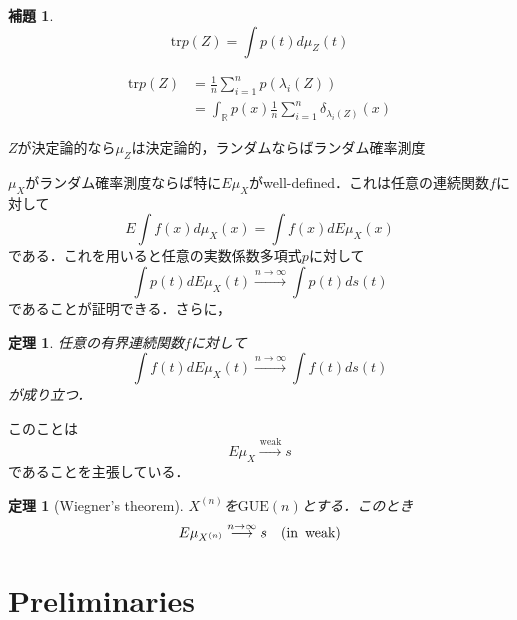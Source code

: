 \documentclass{ltjsarticle}
\makeatletter
\theoremstyle{mystyle1}
\newtheorem{thm}[dfn]{定理}
\newtheorem{lem}[dfn]{補題}
\theoremstyle{mystyle2}
\theoremstyle{mystyle3}
\renewenvironment{proof}[1][\proofname]{\par
  \pushQED{\qed}%
  \normalfont
  \topsep6\p@\@plus6\p@ \trivlist
  \item[\hskip\labelsep{\bfseries\sffamily #1}]\ignorespaces
}{%
  \popQED\endtrivlist\@endpefalse
}
\renewcommand\proofname{証明}
\makeatother
\begin{document}
\begin{lem}
    \begin{equation}
        \mathrm{tr}p(Z)=\int p(t)d\mu_Z(t)
    \end{equation}
\end{lem}

\begin{proof}
    \begin{equation}
        \begin{split}
            \mathrm{tr}p(Z)&=\frac{1}{n}\sum_{i=1}^np(\lambda_i(Z))\\
            &=\int_\mathbb{R}p(x)\frac{1}{n}\sum_{i=1}^n\delta_{\lambda_i(Z)}(x)
        \end{split}
    \end{equation}
\end{proof}

$Z$が決定論的なら$\mu_Z$は決定論的，ランダムならばランダム確率測度

$\mu_X$がランダム確率測度ならば特に$E\mu_{X}$がwell-defined．これは任意の連続関数$f$に対して
\begin{equation}
    E\int f(x)d\mu_{X}(x)=\int f(x)dE\mu_{X}(x)
\end{equation}
である．これを用いると任意の実数係数多項式$p$に対して
\begin{equation}
    \int p(t)dE\mu_{X}(t)\overset{n\to\infty}{\longrightarrow}\int p(t)ds(t)
\end{equation}
であることが証明できる．さらに，
\begin{thm}
    任意の有界連続関数$f$に対して
    \begin{equation}
        \int f(t)dE\mu_{X}(t)\overset{n\to\infty}{\longrightarrow}\int f(t)ds(t)
    \end{equation}
    が成り立つ．
\end{thm}
このことは
\begin{equation}
    E\mu_{X}\overset{\mathrm{weak}}{\longrightarrow} s
\end{equation}
であることを主張している．

\begin{thm}[Wiegner's theorem]
    $X^{(n)}$を$\mathrm{GUE}(n)$とする．このとき
    \begin{equation}
        E\mu_{X^{(n)}}\overset{n\to\infty}{\longrightarrow} s\quad(\textrm{in\, weak})
    \end{equation}
\end{thm}

\section{Preliminaries}
\end{document}
